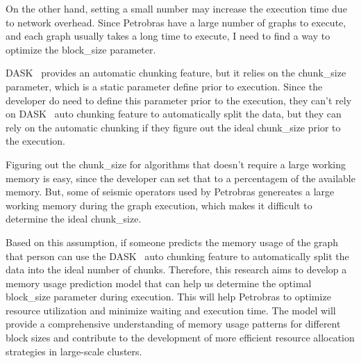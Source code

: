 On the other hand, setting a small number may increase the execution time due to network overhead.
Since Petrobras have a large number of graphs to execute, and each graph usually takes a long time to execute, I need to find a way to optimize the block\_size parameter.

DASK~\cite{dask} provides an automatic chunking feature, but it relies on the chunk\_size parameter, which is a static parameter define prior to execution.
Since the developer do need to define this parameter prior to the execution, they can't rely on DASK~\cite{dask} auto chunking feature to automatically split the data, but they can rely on the automatic chunking if they figure out the ideal chunk\_size prior to the execution.

Figuring out the chunk\_size for algorithms that doesn't require a large working memory is easy, since the developer can set that to a percentagem of the available memory.
But, some of seismic operators used by Petrobras genereates a large working memory during the graph execution, which makes it difficult to determine the ideal chunk\_size.

Based on this assumption, if someone predicts the memory usage of the graph that person can use the DASK~\cite{dask} auto chunking feature to automatically split the data into the ideal number of chunks.
Therefore, this research aims to develop a memory usage prediction model that can help us determine the optimal block\_size parameter during execution.
This will help Petrobras to optimize resource utilization and minimize waiting and execution time.
The model will provide a comprehensive understanding of memory usage patterns for different block sizes and contribute to the development of more efficient resource allocation strategies in large-scale clusters.
